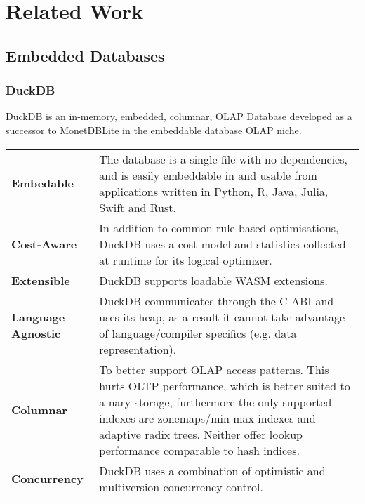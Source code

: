 \chapter{Related Work}
\section{Embedded Databases}
\subsection{DuckDB}
DuckDB is an in-memory, embedded, columnar, OLAP Database\cite{DuckDBPaper} developed as a successor to MonetDBLite\cite{MonetDBLitePaper} in the embeddable database OLAP niche.
\begin{center}
    \begin{tabular}{l p{}}
        \textbf{Embedable}         & The database is a single file with no dependencies, and is easily embeddable in and usable from applications written in Python, R, Java, Julia, Swift and Rust\cite{DuckDBDocs}. \\
        \textbf{Cost-Aware}        & In addition to common rule-based optimisations, DuckDB uses a cost-model and statistics collected at runtime for its logical optimizer.                                          \\
        \textbf{Extensible}        & DuckDB supports loadable WASM extensions.                                                                                                                                        \\
        \textbf{Language Agnostic} & DuckDB communicates through the C-ABI and uses its heap, as a result it cannot take advantage of language/compiler specifics (e.g. data representation).                         \\
        \textbf{Columnar}          & To better support OLAP access patterns. This hurts OLTP performance, which is better suited to a nary storage, furthermore the only supported indexes are zonemaps/min-max
        indexes and adaptive radix trees. Neither offer lookup performance comparable to hash indices.                                         \\
        \textbf{Concurrency}       & DuckDB uses a combination of optimistic and multiversion concurrency control.                                                                                                    \\
    \end{tabular}
\end{center}
\noindent

